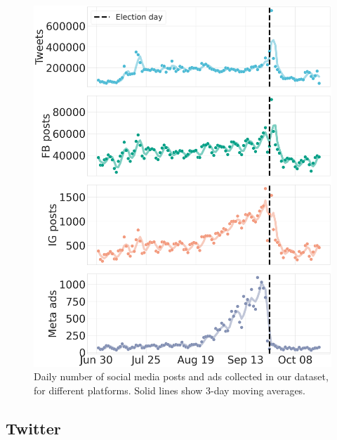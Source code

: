 \documentclass[letterpaper]{article} %
\begin{document}
\begin{figure}[!t]
    \centering
    \includegraphics[width=\linewidth]{time_series.png}
    \caption{Daily number of social media posts and ads collected in our dataset, for different platforms. Solid lines show 3-day moving averages.}
    \label{fig:time-series}
\end{figure}

\subsection{Twitter}
\end{document}
